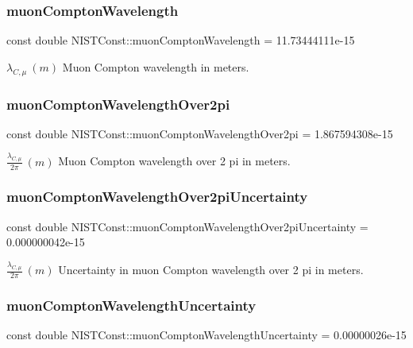 \subsubsection{\texorpdfstring{muon\+Compton\+Wavelength}{muonComptonWavelength}}
{\footnotesize\ttfamily const double N\+I\+S\+T\+Const\+::muon\+Compton\+Wavelength = 11.\+73444111e-\/15}

$\lambda_{C,\mu} \ (m)$ Muon Compton wavelength in meters. \mbox{\label{group___muon_ga4a55b49a126bc1f308e50dfa6869cd76}} 
\subsubsection{\texorpdfstring{muon\+Compton\+Wavelength\+Over2pi}{muonComptonWavelengthOver2pi}}
{\footnotesize\ttfamily const double N\+I\+S\+T\+Const\+::muon\+Compton\+Wavelength\+Over2pi = 1.\+867594308e-\/15}

$\frac{\lambda_{C,\mu}}{2\pi} \ (m)$ Muon Compton wavelength over 2 pi in meters. \mbox{\label{group___muon_ga7327c823c40a8b0d6f6f5ecfbdb52b68}} 
\subsubsection{\texorpdfstring{muon\+Compton\+Wavelength\+Over2pi\+Uncertainty}{muonComptonWavelengthOver2piUncertainty}}
{\footnotesize\ttfamily const double N\+I\+S\+T\+Const\+::muon\+Compton\+Wavelength\+Over2pi\+Uncertainty = 0.\+000000042e-\/15}

$\frac{\lambda_{C,\mu}}{2\pi} \ (m)$ Uncertainty in muon Compton wavelength over 2 pi in meters. \mbox{\label{group___muon_gae48b3636db6004dfce70688e14d5ec59}} 
\subsubsection{\texorpdfstring{muon\+Compton\+Wavelength\+Uncertainty}{muonComptonWavelengthUncertainty}}
{\footnotesize\ttfamily const double N\+I\+S\+T\+Const\+::muon\+Compton\+Wavelength\+Uncertainty = 0.\+00000026e-\/15}


